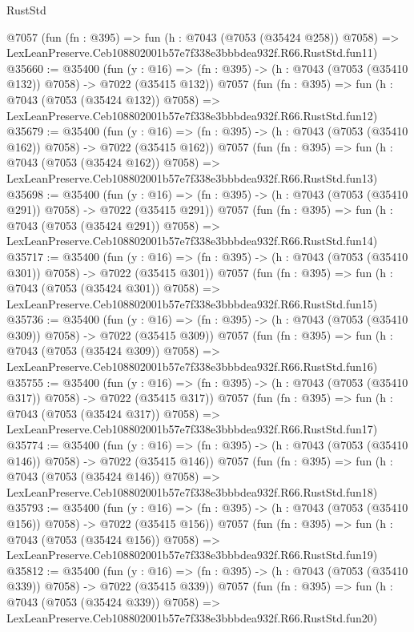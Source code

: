 \begin{lexlean}{RustStd}
\begin{coremodule}
    @7057
    (fun (fn : @395) =>
    fun (h : @7043 (@7053 (@35424 @258)) @7058) =>
    LexLeanPreserve.Ceb108802001b57e7f338e3bbbdea932f.R66.RustStd.fun11)
@35660 := @35400
    (fun (y : @16) => (fn : @395) -> (h : @7043 (@7053 (@35410 @132)) @7058) -> @7022 (@35415 @132))
    @7057
    (fun (fn : @395) =>
    fun (h : @7043 (@7053 (@35424 @132)) @7058) =>
    LexLeanPreserve.Ceb108802001b57e7f338e3bbbdea932f.R66.RustStd.fun12)
@35679 := @35400
    (fun (y : @16) => (fn : @395) -> (h : @7043 (@7053 (@35410 @162)) @7058) -> @7022 (@35415 @162))
    @7057
    (fun (fn : @395) =>
    fun (h : @7043 (@7053 (@35424 @162)) @7058) =>
    LexLeanPreserve.Ceb108802001b57e7f338e3bbbdea932f.R66.RustStd.fun13)
@35698 := @35400
    (fun (y : @16) => (fn : @395) -> (h : @7043 (@7053 (@35410 @291)) @7058) -> @7022 (@35415 @291))
    @7057
    (fun (fn : @395) =>
    fun (h : @7043 (@7053 (@35424 @291)) @7058) =>
    LexLeanPreserve.Ceb108802001b57e7f338e3bbbdea932f.R66.RustStd.fun14)
@35717 := @35400
    (fun (y : @16) => (fn : @395) -> (h : @7043 (@7053 (@35410 @301)) @7058) -> @7022 (@35415 @301))
    @7057
    (fun (fn : @395) =>
    fun (h : @7043 (@7053 (@35424 @301)) @7058) =>
    LexLeanPreserve.Ceb108802001b57e7f338e3bbbdea932f.R66.RustStd.fun15)
@35736 := @35400
    (fun (y : @16) => (fn : @395) -> (h : @7043 (@7053 (@35410 @309)) @7058) -> @7022 (@35415 @309))
    @7057
    (fun (fn : @395) =>
    fun (h : @7043 (@7053 (@35424 @309)) @7058) =>
    LexLeanPreserve.Ceb108802001b57e7f338e3bbbdea932f.R66.RustStd.fun16)
@35755 := @35400
    (fun (y : @16) => (fn : @395) -> (h : @7043 (@7053 (@35410 @317)) @7058) -> @7022 (@35415 @317))
    @7057
    (fun (fn : @395) =>
    fun (h : @7043 (@7053 (@35424 @317)) @7058) =>
    LexLeanPreserve.Ceb108802001b57e7f338e3bbbdea932f.R66.RustStd.fun17)
@35774 := @35400
    (fun (y : @16) => (fn : @395) -> (h : @7043 (@7053 (@35410 @146)) @7058) -> @7022 (@35415 @146))
    @7057
    (fun (fn : @395) =>
    fun (h : @7043 (@7053 (@35424 @146)) @7058) =>
    LexLeanPreserve.Ceb108802001b57e7f338e3bbbdea932f.R66.RustStd.fun18)
@35793 := @35400
    (fun (y : @16) => (fn : @395) -> (h : @7043 (@7053 (@35410 @156)) @7058) -> @7022 (@35415 @156))
    @7057
    (fun (fn : @395) =>
    fun (h : @7043 (@7053 (@35424 @156)) @7058) =>
    LexLeanPreserve.Ceb108802001b57e7f338e3bbbdea932f.R66.RustStd.fun19)
@35812 := @35400
    (fun (y : @16) => (fn : @395) -> (h : @7043 (@7053 (@35410 @339)) @7058) -> @7022 (@35415 @339))
    @7057
    (fun (fn : @395) =>
    fun (h : @7043 (@7053 (@35424 @339)) @7058) =>
    LexLeanPreserve.Ceb108802001b57e7f338e3bbbdea932f.R66.RustStd.fun20)

\end{coremodule}
\end{lexlean}
